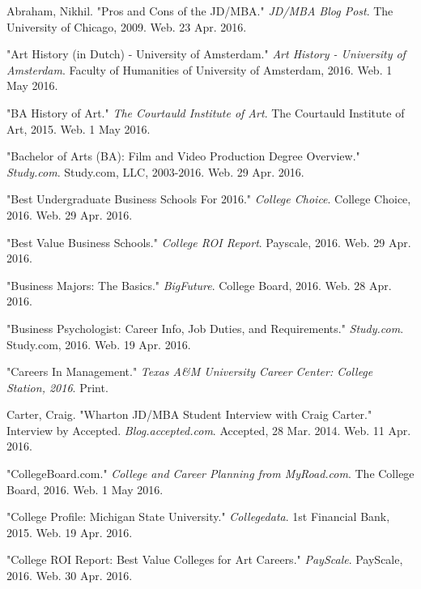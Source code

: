 \newpage 
\newpage 
{}
\begin{workscited}
\begin{flushleft}
\linespread{1.5}

\bibent
Abraham, Nikhil. "Pros and Cons of the JD/MBA." \textit{JD/MBA Blog Post}. The University of 
Chicago, 2009. Web. 23 Apr. 2016.

\bibent
"Art History (in Dutch) - University of Amsterdam." \textit{Art History - University of Amsterdam}.
Faculty of Humanities of University of Amsterdam, 2016. Web. 1 May 2016.

\bibent
"BA History of Art." \textit{The Courtauld Institute of Art}. The Courtauld Institute of Art, 2015. Web. 1 
May 2016.

\bibent
"Bachelor of Arts (BA): Film and Video Production Degree Overview." \textit{Study.com}. Study.com, 
LLC, 2003-2016. Web. 29 Apr. 2016.  

\bibent
"Best Undergraduate Business Schools For 2016." \textit{College Choice}. College Choice, 2016. Web. 29 Apr. 2016.

\bibent
"Best Value Business Schools." \textit{College ROI Report}. Payscale, 2016. Web. 29 Apr. 2016.

\bibent
"Business Majors: The Basics." \textit{BigFuture}. College Board, 2016. Web. 28 Apr. 2016.

\bibent
	"Business Psychologist: Career Info, Job Duties, and Requirements." \textit{Study.com}. Study.com, 
2016. Web. 19 Apr. 2016. 

\bibent
"Careers In Management." \textit{Texas A\&M University Career Center: College Station, 2016}. Print.

\bibent
Carter, Craig. "Wharton JD/MBA Student Interview with Craig Carter." Interview by Accepted. 
\textit{Blog.accepted.com}. Accepted, 28 Mar. 2014. Web. 11 Apr. 2016.

\bibent
"CollegeBoard.com." \textit{College and Career Planning from MyRoad.com}. The College Board,
2016. Web. 1 May 2016.

\bibent
"College Profile: Michigan State University." \textit{Collegedata}. 1st Financial Bank, 2015. Web. 		19 Apr. 2016.  

\bibent
"College ROI Report: Best Value Colleges for Art Careers." \textit{PayScale}. PayScale, 2016. Web. 30 
Apr. 2016.


\end{flushleft}
\end{workscited}
